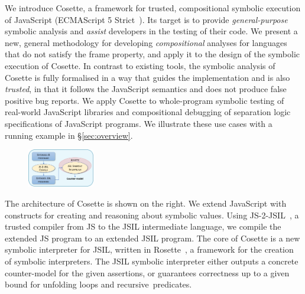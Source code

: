 \documentclass[sigconf, review]{acmart}
\newcommand{\jsil}{JSIL\xspace}
\newcommand{\JSComp}{JS-2-JSIL\xspace}
\newcommand{\cosette}{Cosette\xspace}
\newcommand{\pmaxinline}[1]{ {\color{blue} *** PM : #1 ***} }
\begin{document}
  We introduce \cosette, a framework for trusted, compositional 
  symbolic execution of JavaScript
  (ECMAScript 5 Strict~\cite{ecma}). 
  Its target  is to
  provide \emph{general-purpose} symbolic analysis and {\em assist} 
  developers in the testing of their code.
  We present a new, general methodology for developing {\em compositional} 
  analyses for languages that do not satisfy the frame property, 
  and apply it to the design of the symbolic execution of Cosette. 
  In contrast to existing tools, the symbolic analysis of \cosette 
  is fully formalised in a way that guides the implementation and is
  also {\em trusted}, in that it  follows the JavaScript
  semantics and does not produce false positive bug reports.
  We apply Cosette to whole-program symbolic testing of 
  real-world JavaScript libraries and compositional debugging of separation 
  logic specifications of JavaScript programs. We illustrate these use cases 
  with a running example in \S\ref{sec:overview}.

\begin{figure}
\vspace*{-0.3cm}
\hspace*{-0.63cm}
\centering
\includegraphics[width=0.26\textwidth]{figures/jilette_blue.png}
\vspace*{-0.55cm}
\label{fig:jilette:diagram}
\end{figure}

The architecture of \cosette is shown on the right. We extend JavaScript with constructs for creating and reasoning about symbolic values. Using \JSComp~\cite{javert}, a trusted compiler from JS to the \jsil intermediate language, we compile the extended JS program to an extended \jsil program. The core of \cosette is a new symbolic interpreter for
\jsil,  written in 
Rosette~\cite{Rosette2,Rosette1}, a framework for the creation of
symbolic interpreters. The 
JSIL symbolic interpreter either outputs a concrete counter-model for the given assertions, or guarantees correctness up to a given bound for unfolding loops and recursive~predicates. %
\end{document}
